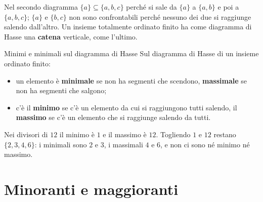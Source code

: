 \begin{concetto}
\begin{center}
\end{center}
Nel secondo diagramma $\{a\} \subseteq \{a, b, c\}$ perché si sale da $\{a\}$ a $\{a, b\}$ e poi a $\{a, b, c\}$; $\{a\}$ e $\{b, c\}$ non sono
confrontabili perché nessuno dei due si raggiunge salendo dall'altro. Un insieme totalmente ordinato finito ha come diagramma
di Hasse una \textbf{catena} verticale, come l'ultimo.
\end{concetto}

\begin{esempio}{Minimi e minimali sul diagramma di Hasse}
    Sul diagramma di Hasse di un insieme ordinato finito:
    \begin{itemize}
        \item un elemento è \textbf{minimale} se non ha segmenti che scendono, \textbf{massimale} se non ha segmenti che salgono;
        \item c'è il \textbf{minimo} se c'è un elemento da cui si raggiungono tutti salendo, il \textbf{massimo} se c'è un elemento
              che si raggiunge salendo da tutti.
    \end{itemize}
    Nei divisori di $12$ il minimo è $1$ e il massimo è $12$. Togliendo $1$ e $12$ restano $\{2, 3, 4, 6\}$: i minimali sono $2$ e $3$,
    i massimali $4$ e $6$, e non ci sono né minimo né massimo.
\end{esempio}

\section{Minoranti e maggioranti}\label{sec:minoranti}


